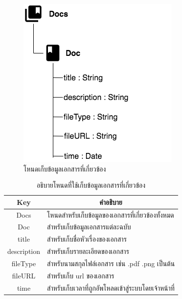 \newpage
\begin{figure}[H]
	\centering
	\includegraphics[width=0.5\columnwidth]
	{Figures/3/DB/nodeDoc}
	\caption{โหนดเก็บข้อมูลเอกสารที่เกี่ยวข้อง}
	\label{Fig:DB4}
\end{figure}
\begin{table}[H]
	\centering
	\caption{อธิบายโหนดที่ใช้เก็บข้อมูลเอกสารที่เกี่ยวข้อง}
	\label{my-label1}
	\begin{tabular}{|c|p{10cm}|}
		\hline
		\multicolumn{1}{|c|}{\textbf{Key}} & \multicolumn{1}{c|}{\textbf{คำอธิบาย}} \\ \hline
		Docs & โหนดสำหรับเก็บข้อมูลของเอกสารที่เกี่ยวข้องทั้งหมด \\ \hline
		Doc &  สำหรับเก็บข้อมูลเอกสารแต่ละฉบับ \\ \hline
		title & สำหรับเก็บชื่อหัวเรื่องของเอกสาร \\ \hline
		description & สำหรับเก็บรายละเอียดของเอกสาร \\ \hline
		fileType & สำหรับนามสกุลไฟล์เอกสาร เช่น .pdf .png เป็นต้น \\ \hline
		fileURL & สำหรับเก็บ url ของเอกสาร\\ \hline
		time & สำหรับเก็บเวลาที่ถูกอัพโหลดเข้าสู่ระบบโดยเจ้าหน้าที่\\ \hline
	\end{tabular}
\end{table}

